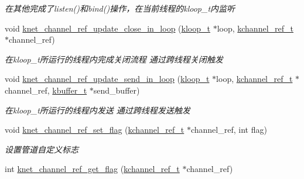 \begin{DoxyCompactItemize}
\begin{DoxyCompactList}\small\item\em 在其他完成了listen()和bind()操作，在当前线程的kloop\+\_\+t内监听 \end{DoxyCompactList}\item 
void \hyperlink{a00049_a52b9ae9721f4e2dc6d6d649191c5d59d_a52b9ae9721f4e2dc6d6d649191c5d59d}{knet\+\_\+channel\+\_\+ref\+\_\+update\+\_\+close\+\_\+in\+\_\+loop} (\hyperlink{a00051_a97fc76209a58362019f1ded9169e397f_a97fc76209a58362019f1ded9169e397f}{kloop\+\_\+t} $\ast$loop, \hyperlink{a00051_a3b7e82599367eade261456f60ebe2cd9_a3b7e82599367eade261456f60ebe2cd9}{kchannel\+\_\+ref\+\_\+t} $\ast$channel\+\_\+ref)
\begin{DoxyCompactList}\small\item\em 在kloop\+\_\+t所运行的线程内完成关闭流程 通过跨线程关闭触发 \end{DoxyCompactList}\item 
void \hyperlink{a00049_a3baff51e9f31471fbbac3d5ec4d125f1_a3baff51e9f31471fbbac3d5ec4d125f1}{knet\+\_\+channel\+\_\+ref\+\_\+update\+\_\+send\+\_\+in\+\_\+loop} (\hyperlink{a00051_a97fc76209a58362019f1ded9169e397f_a97fc76209a58362019f1ded9169e397f}{kloop\+\_\+t} $\ast$loop, \hyperlink{a00051_a3b7e82599367eade261456f60ebe2cd9_a3b7e82599367eade261456f60ebe2cd9}{kchannel\+\_\+ref\+\_\+t} $\ast$channel\+\_\+ref, \hyperlink{a00051_a4b09a7574cd440f9b94285ab73c81b4e_a4b09a7574cd440f9b94285ab73c81b4e}{kbuffer\+\_\+t} $\ast$send\+\_\+buffer)
\begin{DoxyCompactList}\small\item\em 在kloop\+\_\+t所运行的线程内发送 通过跨线程发送触发 \end{DoxyCompactList}\item 
void \hyperlink{a00049_a2e022541aa1a4ff04a15cd134788e335_a2e022541aa1a4ff04a15cd134788e335}{knet\+\_\+channel\+\_\+ref\+\_\+set\+\_\+flag} (\hyperlink{a00051_a3b7e82599367eade261456f60ebe2cd9_a3b7e82599367eade261456f60ebe2cd9}{kchannel\+\_\+ref\+\_\+t} $\ast$channel\+\_\+ref, int flag)
\begin{DoxyCompactList}\small\item\em 设置管道自定义标志 \end{DoxyCompactList}\item 
int \hyperlink{a00049_ab8e70df787656b096fb57716453fdb62_ab8e70df787656b096fb57716453fdb62}{knet\+\_\+channel\+\_\+ref\+\_\+get\+\_\+flag} (\hyperlink{a00051_a3b7e82599367eade261456f60ebe2cd9_a3b7e82599367eade261456f60ebe2cd9}{kchannel\+\_\+ref\+\_\+t} $\ast$channel\+\_\+ref)

\end{DoxyCompactItemize}
